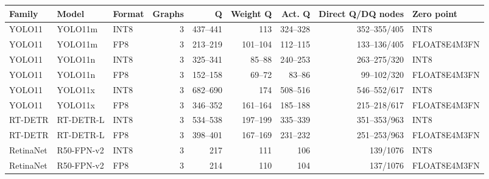 \begin{tabular}{lllrrrrrl}
\toprule
Family & Model & Format & Graphs & Q & Weight Q & Act. Q & Direct Q/DQ nodes & Zero point \\
\midrule
YOLO11 & YOLO11m & INT8 & 3 & 437--441 & 113 & 324--328 & 352--355/405 & INT8 \\
YOLO11 & YOLO11m & FP8 & 3 & 213--219 & 101--104 & 112--115 & 133--136/405 & FLOAT8E4M3FN \\
YOLO11 & YOLO11n & INT8 & 3 & 325--341 & 85--88 & 240--253 & 263--275/320 & INT8 \\
YOLO11 & YOLO11n & FP8 & 3 & 152--158 & 69--72 & 83--86 & 99--102/320 & FLOAT8E4M3FN \\
YOLO11 & YOLO11x & INT8 & 3 & 682--690 & 174 & 508--516 & 546--552/617 & INT8 \\
YOLO11 & YOLO11x & FP8 & 3 & 346--352 & 161--164 & 185--188 & 215--218/617 & FLOAT8E4M3FN \\
RT-DETR & RT-DETR-L & INT8 & 3 & 534--538 & 197--199 & 335--339 & 351--353/963 & INT8 \\
RT-DETR & RT-DETR-L & FP8 & 3 & 398--401 & 167--169 & 231--232 & 251--253/963 & FLOAT8E4M3FN \\
RetinaNet & R50-FPN-v2 & INT8 & 3 & 217 & 111 & 106 & 139/1076 & INT8 \\
RetinaNet & R50-FPN-v2 & FP8 & 3 & 214 & 110 & 104 & 137/1076 & FLOAT8E4M3FN \\
\bottomrule
\end{tabular}
